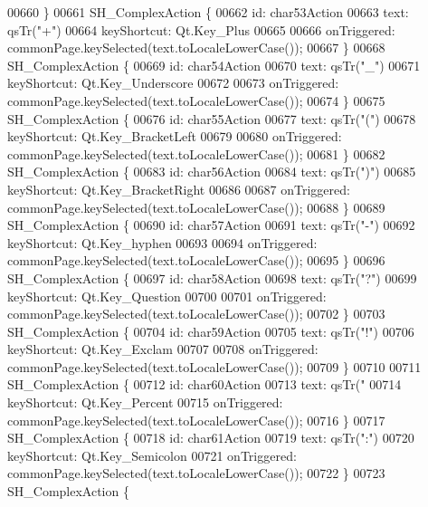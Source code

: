 \begin{DoxyCode}
00660     \}
00661     SH\_ComplexAction \{
00662         \textcolor{keywordtype}{id}: char53Action
00663         text: qsTr(\textcolor{stringliteral}{"+"})
00664         keyShortcut: Qt.Key\_Plus
00665 
00666         onTriggered: commonPage.keySelected(text.toLocaleLowerCase());
00667     \}
00668     SH\_ComplexAction \{
00669         \textcolor{keywordtype}{id}: char54Action
00670         text: qsTr(\textcolor{stringliteral}{"\_"})
00671         keyShortcut: Qt.Key\_Underscore
00672 
00673         onTriggered: commonPage.keySelected(text.toLocaleLowerCase());
00674     \}
00675     SH\_ComplexAction \{
00676         \textcolor{keywordtype}{id}: char55Action
00677         text: qsTr(\textcolor{stringliteral}{"("})
00678         keyShortcut: Qt.Key\_BracketLeft
00679 
00680         onTriggered: commonPage.keySelected(text.toLocaleLowerCase());
00681     \}
00682     SH\_ComplexAction \{
00683         \textcolor{keywordtype}{id}: char56Action
00684         text: qsTr(\textcolor{stringliteral}{")"})
00685         keyShortcut: Qt.Key\_BracketRight
00686 
00687         onTriggered: commonPage.keySelected(text.toLocaleLowerCase());
00688     \}
00689     SH\_ComplexAction \{
00690         \textcolor{keywordtype}{id}: char57Action
00691         text: qsTr(\textcolor{stringliteral}{"-"})
00692         keyShortcut: Qt.Key\_hyphen
00693 
00694         onTriggered: commonPage.keySelected(text.toLocaleLowerCase());
00695     \}
00696     SH\_ComplexAction \{
00697         \textcolor{keywordtype}{id}: char58Action
00698         text: qsTr(\textcolor{stringliteral}{"?"})
00699         keyShortcut: Qt.Key\_Question
00700 
00701         onTriggered: commonPage.keySelected(text.toLocaleLowerCase());
00702     \}
00703     SH\_ComplexAction \{
00704         \textcolor{keywordtype}{id}: char59Action
00705         text: qsTr(\textcolor{stringliteral}{"!"})
00706         keyShortcut: Qt.Key\_Exclam
00707 
00708         onTriggered: commonPage.keySelected(text.toLocaleLowerCase());
00709     \}
00710 
00711     SH\_ComplexAction \{
00712         \textcolor{keywordtype}{id}: char60Action
00713         text: qsTr(\textcolor{stringliteral}{"%
00714         keyShortcut: Qt.Key\_Percent
00715         onTriggered: commonPage.keySelected(text.toLocaleLowerCase());
00716     \}
00717     SH\_ComplexAction \{
00718         \textcolor{keywordtype}{id}: char61Action
00719         text: qsTr(\textcolor{stringliteral}{":"})
00720         keyShortcut: Qt.Key\_Semicolon
00721         onTriggered: commonPage.keySelected(text.toLocaleLowerCase());
00722     \}
00723     SH\_ComplexAction \{
}
\end{DoxyCode}
